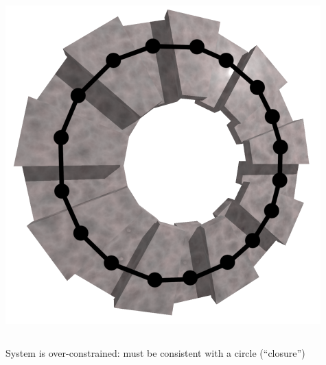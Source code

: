 \documentclass[compress]{beamer}
\begin{document}
\begin{frame}
\begin{columns}
\includegraphics[width=\linewidth]{one_station.png}
\end{columns}

\vfill
System is over-constrained: must be consistent with a circle (``closure'')
\end{frame}
\end{document}
